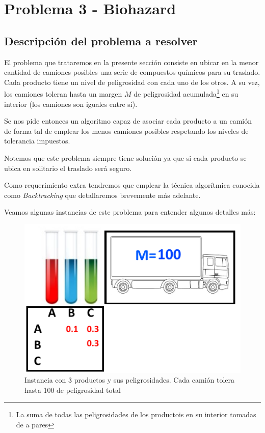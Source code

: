 \section{Problema 3 - Biohazard}


\subsection{Descripción del problema a resolver}

El problema que trataremos en la presente sección consiste en ubicar en la menor cantidad de camiones posibles una serie de compuestos químicos para su traslado. Cada producto tiene un nivel de peligrosidad con cada uno de los otros. A su vez, los camiones toleran hasta un margen $M$ de peligrosidad acumulada\footnote{La suma de todas las peligrosidades de los productois en su interior tomadas de a pares} en su interior (los camiones son iguales entre si). 

Se nos pide entonces un algoritmo capaz de asociar cada producto a un camión de forma tal de emplear los menos camiones posibles respetando los niveles de tolerancia impuestos. 

Notemos que este problema siempre tiene solución ya que si cada producto se ubica en solitario el traslado será seguro.

Como requerimiento extra tendremos que emplear la técnica algorítmica conocida como \textit{Backtracking} que detallaremos brevemente más adelante.

Veamos algunas instancias de este problema para entender algunos detalles más:

\begin{figure}[H]
\centering
\includegraphics[scale=0.65]{ej3/instancia0.png}
\caption{Instancia con 3 productos y sus peligrosidades. Cada camión tolera hasta 100 de peligrosidad total}
\end{figure}


